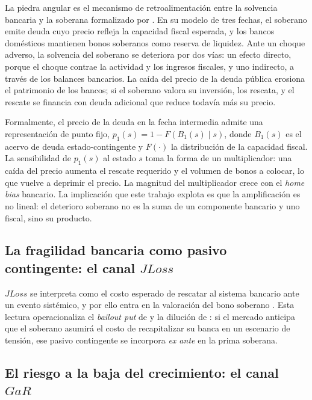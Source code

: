 La piedra angular es el mecanismo de retroalimentación entre la solvencia bancaria y la soberana formalizado por \citet{FarhiTirole2018b}. En su modelo de tres fechas, el soberano emite deuda cuyo precio refleja la capacidad fiscal esperada, y los bancos domésticos mantienen bonos soberanos como reserva de liquidez. Ante un choque adverso, la solvencia del soberano se deteriora por dos vías: un efecto directo, porque el choque contrae la actividad y los ingresos fiscales, y uno indirecto, a través de los balances bancarios. La caída del precio de la deuda pública erosiona el patrimonio de los bancos; si el soberano valora su inversión, los rescata, y el rescate se financia con deuda adicional que reduce todavía más su precio.

Formalmente, el precio de la deuda en la fecha intermedia admite una representación de punto fijo, $p_1(s)=1-F\!\left(B_1(s)\mid s\right)$, donde $B_1(s)$ es el acervo de deuda estado-contingente y $F(\cdot)$ la distribución de la capacidad fiscal. La sensibilidad de $p_1(s)$ al estado $s$ toma la forma de un multiplicador: una caída del precio aumenta el rescate requerido y el volumen de bonos a colocar, lo que vuelve a deprimir el precio. La magnitud del multiplicador crece con el \textit{home bias} bancario. La implicación que este trabajo explota es que la amplificación es no lineal: el deterioro soberano no es la suma de un componente bancario y uno fiscal, sino su producto.

\subsection{La fragilidad bancaria como pasivo contingente: el canal \texorpdfstring{$JLoss$}{JLoss}}

$JLoss$ se interpreta como el costo esperado de rescatar al sistema bancario ante un evento sistémico, y por ello entra en la valoración del bono soberano \citep{Chari2024b}. Esta lectura operacionaliza el \textit{bailout put} de \citet{FarhiTirole2018b} y la dilución de \citet{AcharyaDrechslerSchnabl2014b}: si el mercado anticipa que el soberano asumirá el costo de recapitalizar su banca en un escenario de tensión, ese pasivo contingente se incorpora \textit{ex ante} en la prima soberana.

\subsection{El riesgo a la baja del crecimiento: el canal \texorpdfstring{$GaR$}{GaR}}

